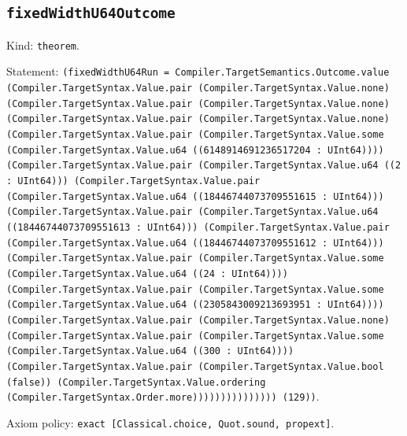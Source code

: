 \documentclass[11pt]{article}
\begin{document}
\subsection*{\texttt{fixedWidthU64Outcome}}
\noindent Kind: \texttt{theorem}.\par
\noindent Statement: \texttt{(fixedWidthU64Run = Compiler.TargetSemantics.Outcome.value (Compiler.TargetSyntax.Value.pair (Compiler.TargetSyntax.Value.none) (Compiler.TargetSyntax.Value.pair (Compiler.TargetSyntax.Value.none) (Compiler.TargetSyntax.Value.pair (Compiler.TargetSyntax.Value.none) (Compiler.TargetSyntax.Value.pair (Compiler.TargetSyntax.Value.some (Compiler.TargetSyntax.Value.u64 ((6148914691236517204 : UInt64)))) (Compiler.TargetSyntax.Value.pair (Compiler.TargetSyntax.Value.u64 ((2 : UInt64))) (Compiler.TargetSyntax.Value.pair (Compiler.TargetSyntax.Value.u64 ((18446744073709551615 : UInt64))) (Compiler.TargetSyntax.Value.pair (Compiler.TargetSyntax.Value.u64 ((18446744073709551613 : UInt64))) (Compiler.TargetSyntax.Value.pair (Compiler.TargetSyntax.Value.u64 ((18446744073709551612 : UInt64))) (Compiler.TargetSyntax.Value.pair (Compiler.TargetSyntax.Value.some (Compiler.TargetSyntax.Value.u64 ((24 : UInt64)))) (Compiler.TargetSyntax.Value.pair (Compiler.TargetSyntax.Value.some (Compiler.TargetSyntax.Value.u64 ((2305843009213693951 : UInt64)))) (Compiler.TargetSyntax.Value.pair (Compiler.TargetSyntax.Value.none) (Compiler.TargetSyntax.Value.pair (Compiler.TargetSyntax.Value.some (Compiler.TargetSyntax.Value.u64 ((300 : UInt64)))) (Compiler.TargetSyntax.Value.pair (Compiler.TargetSyntax.Value.bool (false)) (Compiler.TargetSyntax.Value.ordering (Compiler.TargetSyntax.Order.more))))))))))))))) (129))}.\par
\noindent Axiom policy: \texttt{exact [Classical.choice, Quot.sound, propext]}.\par
\end{document}
